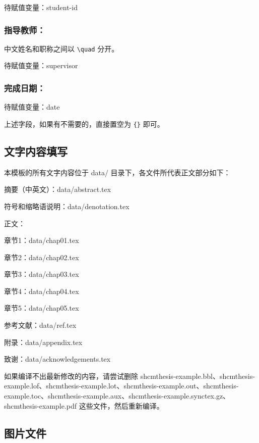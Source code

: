 待赋值变量：student-id

\subsubsection{指导教师：}

中文姓名和职称之间以 \verb|\quad| 分开。

待赋值变量：supervisor

\subsubsection{完成日期：}

待赋值变量：date

上述字段，如果有不需要的，直接置空为 \verb|{}| 即可。

\subsection{文字内容填写}

本模板的所有文字内容位于 data/ 目录下，各文件所代表正文部分如下：

\indent \indent 摘要（中英文）：data/abstract.tex

\indent \indent 符号和缩略语说明：data/denotation.tex

\indent \indent 正文：

\indent \indent \indent \indent 章节1：data/chap01.tex

\indent \indent \indent \indent 章节2：data/chap02.tex

\indent \indent \indent \indent 章节3：data/chap03.tex

\indent \indent \indent \indent 章节4：data/chap04.tex

\indent \indent \indent \indent 章节5：data/chap05.tex

\indent \indent 参考文献：data/ref.tex

\indent \indent 附录：data/appendix.tex

\indent \indent 致谢：data/acknowledgements.tex

如果编译不出最新修改的内容，请尝试删除 shcmthesis-example.bbl、shcmthesis-example.lof、shcmthesis-example.lot、shcmthesis-example.out、shcmthesis-example.toc、shcmthesis-example.aux、shcmthesis-example.synctex.gz、shcmthesis-example.pdf 这些文件，然后重新编译。

\subsection{图片文件}

